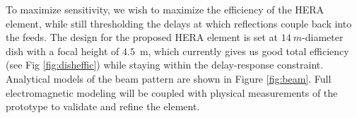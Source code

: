 \documentclass[preprint]{aastex}
\begin{document}
%
%

To maximize sensitivity, we wish to maximize the efficiency of the
HERA element, while still thresholding the delays at which reflections couple
back into the feeds. The design for the proposed HERA element is set
at $14~m$-diameter dish with a focal height of $4.5$~m, which currently gives us
good total efficiency (see Fig \ref{fig:disheffic}) while staying within the delay-response constraint. 
Analytical models of the beam pattern are shown in Figure \ref{fig:beam}.
Full electromagnetic modeling will be coupled with 
physical measurements of the prototype to validate and refine the element.

\end{document}
